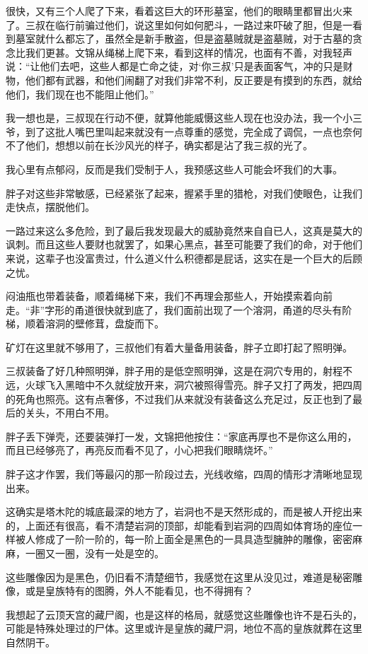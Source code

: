 很快，又有三个人爬了下来，看着这巨大的环形墓室，他们的眼睛里都冒出火来了。三叔在临行前骗过他们，说这里如何如何肥斗，一路过来吓破了胆，但是一看到墓室就什么都忘了，虽然全是新手散盗，但是盗墓贼就是盗墓贼，对于古墓的贪念比我们更甚。文锦从绳梯上爬下来，看到这样的情况，也面有不善，对我轻声说：“让他们去吧，这些人都是亡命之徒，对‘你三叔’只是表面客气，冲的只是财物，他们都有武器，和他们闹翻了对我们非常不利，反正要是有摸到的东西，就给他们，我们现在也不能阻止他们。”

我一想也是，三叔现在行动不便，就算他能威慑这些人现在也没办法，我一个小三爷，到了这批人嘴巴里叫起来就没有一点尊重的感觉，完全成了调侃，一点也奈何不了他们，想想以前在长沙风光的样子，确实都是沾了我三叔的光了。

我心里有点郁闷，反而是我们受制于人，我预感这些人可能会坏我们的大事。

胖子对这些非常敏感，已经紧张了起来，握紧手里的猎枪，对我们使眼色，让我们走快点，摆脱他们。

一路过来这么多危险，到了最后我发现最大的威胁竟然来自自已人，这真是莫大的讽刺。而且这些人要财也就罢了，如果心黑点，甚至可能要了我们的命，对于他们来说，这辈子也没富贵过，什么道义什么积德都是屁话，这实在是一个巨大的后顾之忧。

闷油甁也带着装备，顺着绳梯下来，我们不再理会那些人，开始摸索着向前走。“非”字形的甬道很快就到底了，我们面前出现了一个溶洞，甬道的尽头有阶梯，顺着溶洞的壁修茸，盘旋而下。

矿灯在这里就不够用了，三叔他们有着大量备用装备，胖子立即打起了照明弹。

三叔装备了好几种照明弹，胖子用的是低空照明弹，这是在洞穴专用的，射程不远，火球飞入黑暗中不久就绽放开来，洞穴被照得雪亮。胖子又打了两发，把四周的死角也照亮。这有点奢侈，不过我们从来就没有装备这么充足过，反正也到了最后的关头，不用白不用。

胖子丢下弹壳，还要装弹打一发，文锦把他按住：“家底再厚也不是你这么用的，而且已经够亮了，再亮反而看不见了，小心把我们眼睛烧坏。”

胖子这才作罢，我们等最闪的那一阶段过去，光线收缩，四周的情形才清晰地显现出来。

这确实是塔木陀的城底最深的地方了，岩洞也不是天然形成的，而是被人开挖出来的，上面还有很高，看不清楚岩洞的顶部，却能看到岩洞的四周如体育场的座位一样被人修成了一阶一阶的，每一阶上面全是黑色的一具具造型臃肿的雕像，密密麻麻，一圈又一圈，没有一处是空的。

这些雕像因为是黑色，仍旧看不清楚细节，我感觉在这里从没见过，难道是秘密雕像，或是皇族特有的图腾，外人不能看见，也不得拥有？

我想起了云顶天宫的藏尸阁，也是这样的格局，就感觉这些雕像也许不是石头的，可能是特殊处理过的尸体。这里或许是皇族的藏尸洞，地位不高的皇族就葬在这里自然阴干。

